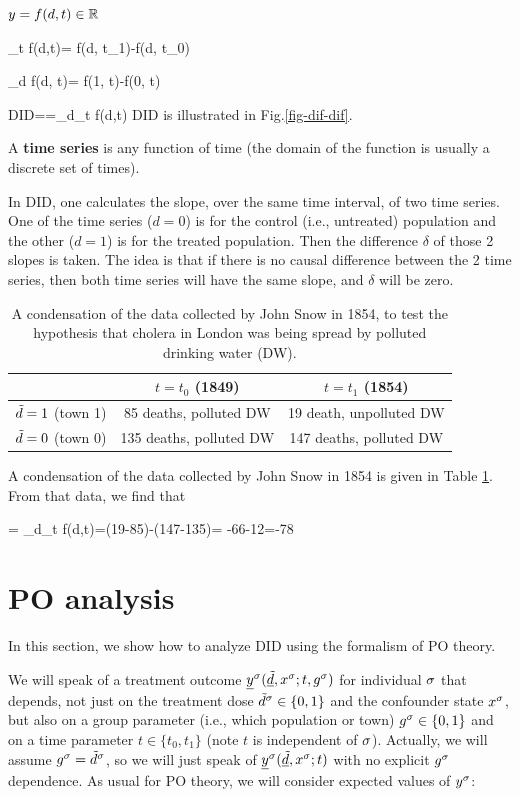 $y=f(d,t)\in { \mathbb{R}}$

\beq
\Delta_t f(d,t)= f(d, t_1)-f(d, t_0)
\eeq

\beq
\Delta_d f(d, t)= f(1, t)-f(0, t)
\eeq

\beq
DID=\delta=\Delta_d\Delta_t f(d,t)
\eeq
DID is illustrated in
 Fig.\ref{fig-dif-dif}. 


A {\bf time series} 
is  any function of time
(the domain of the function
is usually a discrete set of times).


In DID, one calculates the slope,
over the same
time interval,
of two time series. One
of the time series ($d=0$)
is for
the control (i.e., untreated) population
and the other ($d=1$) is
 for the treated population.
Then the 
difference $\delta$ of those 2 slopes is taken.
The idea is that if there is no causal difference
between the 2 time series,
then both time
series will 
have the same slope, and
$\delta$ will be zero.


\begin{table}[h!]
\centering
{\renewcommand{\arraystretch}{1.4}
\begin{tabular}{|c|c|c|}
\hline 
\rowcolor[HTML]{ECF4FF} 
 & $t=t_0 $ (1849) & $t=t_1$ (1854) \\ 
\hline
${\tilde{d}}=1 $ (town 1)\cellcolor[HTML]{ECF4FF}
&85 deaths, polluted DW&19 death, unpolluted DW\\
\hline 
${\tilde{d}}=0 $ (town 0)\cellcolor[HTML]{ECF4FF} 
&135 deaths, polluted DW& 147 deaths, polluted DW\\ 
\end{tabular}
}
\caption{A condensation of the data
collected by 
John Snow in 1854,
to test the hypothesis
that cholera in London was being spread by
polluted drinking water (DW).}
\label{tab-john-snow}
\end{table}

A condensation of the
data collected by John Snow in 1854
is given in Table \ref{tab-john-snow}.
From that data, we find that

\beq
\delta= \Delta_d\Delta_t f(d,t)=(19-85)-(147-135)=
-66-12=-78
\eeq



\section{PO analysis}
In this section,
we show how
to analyze
DID 
using the formalism of PO theory.

We will speak of a treatment 
outcome
${\underline{y}}^\sigma({\underline{\tilde{d}}}, x^\sigma; t, g^\sigma)$
for individual $\sigma$
that depends, not 
just on the treatment dose ${\tilde{d}}^\sigma\in \{0,1\}$
and the confounder state $x^\sigma$,
but also
on a group parameter (i.e., which population
or town)
$g^\sigma\in \{0,1\}$
and on a time parameter $t\in\{t_0, t_1\}$ 
(note $t$ is independent of $\sigma$).
Actually,
we will assume $g^\sigma={\tilde{d}}^\sigma$,
so we will just speak of
${\underline{y}}^\sigma({\underline{\tilde{d}}}, x^\sigma; t)$
with no explicit $g^\sigma$
dependence. As usual for PO theory,
we will consider
expected values of $y^\sigma$:


